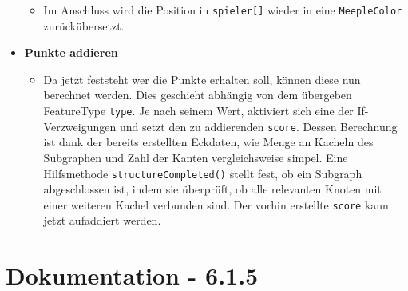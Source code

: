 \begin{itemize}
\begin{itemize}
	
	\item[]
		Im Anschluss wird die Position in \texttt{spieler[]} wieder in eine \texttt{MeepleColor} zurückübersetzt.
	
	\end{itemize}	
	
\clearpage	
	
\item \textbf{Punkte addieren}
	\begin{itemize}
	\item[]
		Da jetzt feststeht wer die Punkte erhalten soll, können diese nun berechnet werden.
		Dies geschieht abhängig von dem übergeben FeatureType \texttt{type}. Je nach seinem Wert, aktiviert sich 
		eine der If-Verzweigungen und setzt den zu addierenden \texttt{score}. Dessen Berechnung ist dank der 
		bereits 
		erstellten 
		Eckdaten, 	wie Menge an Kacheln des Subgraphen und Zahl der Kanten vergleichsweise simpel. Eine 
		Hilfsmethode \texttt{structureCompleted()} stellt fest, ob ein Subgraph abgeschlossen ist, indem sie 
		überprüft, 
		ob alle relevanten 
		Knoten mit einer weiteren Kachel verbunden sind. Der vorhin erstellte \texttt{score} kann jetzt 
		aufaddiert werden.
	
	\end{itemize}		
	
\clearpage
	
\end{itemize}
\section{Dokumentation - 6.1.5}

